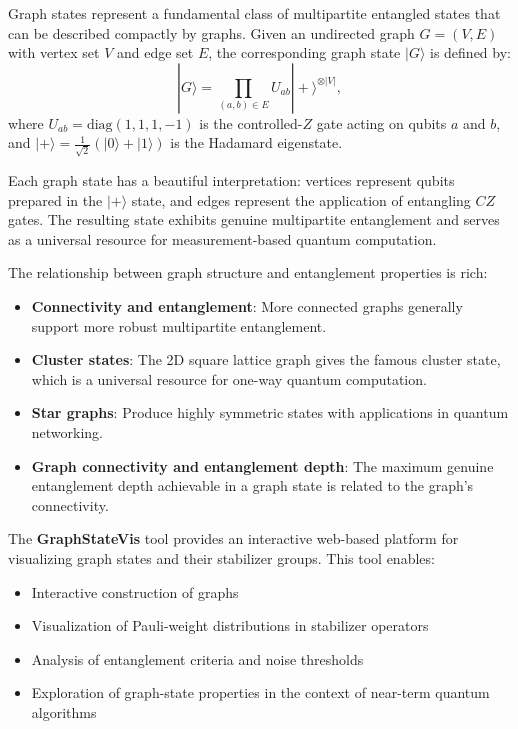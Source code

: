 \documentclass[12pt,a4paper]{article}
\begin{document}
Graph states represent a fundamental class of multipartite entangled states that can be described compactly by graphs. Given an undirected graph $G = (V, E)$ with vertex set $V$ and edge set $E$, the corresponding graph state $|G\rangle$ is defined by:
\begin{equation}
	|G\rangle = \prod_{(a,b) \in E} U_{ab} |+\rangle^{\otimes |V|},
\end{equation}
where $U_{ab} = \text{diag}(1, 1, 1, -1)$ is the controlled-$Z$ gate acting on qubits $a$ and $b$, and $|+\rangle = \frac{1}{\sqrt{2}}(|0\rangle + |1\rangle)$ is the Hadamard eigenstate.

Each graph state has a beautiful interpretation: vertices represent qubits prepared in the $|+\rangle$ state, and edges represent the application of entangling $CZ$ gates. The resulting state exhibits genuine multipartite entanglement and serves as a universal resource for measurement-based quantum computation.

The relationship between graph structure and entanglement properties is rich:
\begin{itemize}
	\item \textbf{Connectivity and entanglement}: More connected graphs generally support more robust multipartite entanglement.
	\item \textbf{Cluster states}: The 2D square lattice graph gives the famous cluster state, which is a universal resource for one-way quantum computation.
	\item \textbf{Star graphs}: Produce highly symmetric states with applications in quantum networking.
	\item \textbf{Graph connectivity and entanglement depth}: The maximum genuine entanglement depth achievable in a graph state is related to the graph's connectivity.
\end{itemize}

The \textbf{GraphStateVis} tool \cite{GraphStateVis} provides an interactive web-based platform for visualizing graph states and their stabilizer groups. This tool enables:
\begin{itemize}
	\item Interactive construction of graphs
	\item Visualization of Pauli-weight distributions in stabilizer operators
	\item Analysis of entanglement criteria and noise thresholds
	\item Exploration of graph-state properties in the context of near-term quantum algorithms
\end{itemize}
\end{document}
